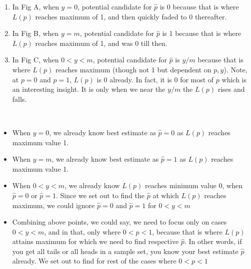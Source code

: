 \documentclass[float=false,crop=false]{standalone}
\begin{document}
\begin{enumerate}
\def\labelenumi{\arabic{enumi}.}
\tightlist
\item
  In Fig A, when \(y=0\), potential candidate for \(\hat{p}\) is 0
  because that is where \(L(p)\) reaches maximum of 1, and then quickly
  faded to 0 thereafter.
\item
  In Fig B, when \(y=m\), potential candidate for \(\hat{p}\) is 1
  because that is where \(L(p)\) reaches maximum of 1, and was 0 till
  then.
\item
  In Fig C, when \(0<y<m\), potential candidate for \(\hat{p}\) is
  \(y/m\) because that is where \(L(p)\) reaches maximum (though not 1
  but dependent on \(p,y\)). Note, at \(p=0\) and \(p=1\), \(L(p)\) is 0
  already. In fact, it is 0 for most of \(p\) which is an interesting
  insight. It is only when we near the \(y/m\) the \(L(p)\) rises and
  falls.
\end{enumerate}
    \begin{center}
    \end{center}
    { \hspace*{\fill} \\}
    \begin{tcolorbox}[colback=green!5,colframe=green!40!black,title=Bernoulli Distribution; $m$ trials]
\begin{itemize}
\item When $y=0$, we already know best estimate as $\hat{p}=0$ as $L(p)$ reaches maximum value 1.
\item When $y=m$, we already know best estimate as $\hat{p}=1$ as $L(p)$ reaches maximum value 1.
\item When $0<y<m$, we already know $L(p)$ reaches minimum value 0, when $\hat{p} = 0$ or $\hat{p} = 1$. Since we set out to find the $\hat{p}$ at which $L(p)$ reaches maximum, we could ignore $\hat{p} = 0$ and $\hat{p} = 1$ for $0<y<m$
\item Combining above points, we could say, we need to focus only on cases $0 < y < m$, and in that, only where $0 < p < 1$, because that is where $L(p)$ attains maximum for which we need to find respective $\hat{p}$. In other words, if you get all tails or all heads in a sample set, you know your best estimate $\hat{p}$ already. We set out to find for rest of the cases where $0 < p < 1$ 
\end{itemize}
\end{tcolorbox}
\end{document}
